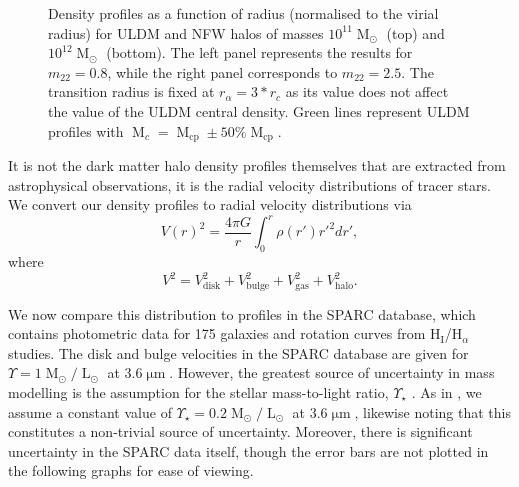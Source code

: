 \documentclass[a4paper,11pt]{article}
\begin{document}
\begin{figure}
\begin{tabular}{cc}
\end{tabular}
\caption{Density profiles as a function of radius (normalised to the virial radius) for ULDM and NFW halos of masses $10^{11}\operatorname{M}_{\odot}$ (top) and $10^{12}\operatorname{M}_{\odot}$ (bottom). The left panel represents the results for $m_{22} = 0.8$, while the right panel corresponds to $m_{22}=2.5$. The transition radius is fixed at $r_{\alpha} = 3*r_c$ as its value does not affect the value of the ULDM central density. Green lines represent  ULDM profiles with $\operatorname{M}_c = \operatorname{M}_{\mathrm{cp}} \pm 50 \% \operatorname{M}_{\mathrm{cp}}$.}\label{fig:profiles}
\end{figure}

It is not the dark matter halo density profiles themselves that are extracted from astrophysical observations, it is the radial velocity distributions of tracer stars. We convert our density profiles to radial velocity distributions \cite{Sofue:2008wt} via 
%
\begin{equation}
    V(r)^2 = \frac{4\pi G}{r}\int_0^r \rho(r')r'^2 dr',
\end{equation}
where 
\begin{equation}\label{eq:vel_decomp}
    V^2 = V_{\mathrm{disk}}^2 + V_{\mathrm{bulge}}^2 + V_{\mathrm{gas}}^2 + V_{\mathrm{halo}}^2.
\end{equation}
%


We now compare this distribution to profiles in the SPARC database, which contains photometric data for 175 galaxies and rotation curves from $\mathrm{H}_{\mathrm{I}}$/$\mathrm{H}_{\alpha}$ studies. The disk and bulge velocities in the SPARC database are given for $\Upsilon = 1 \operatorname{M}_{\odot}/\operatorname{L}_{\odot}$ at $3.6\operatorname{\mu m}$. However, the greatest source of uncertainty in mass modelling is the assumption for the stellar mass-to-light ratio, $\Upsilon_\star$ \cite{Lelli:2016zqa}. As in \cite{Robles:2018fur}, we  assume a constant value of $\Upsilon_\star = 0.2 \operatorname{M}_{\odot}/\operatorname{L}_{\odot}$ at $3.6\operatorname{\mu m}$, likewise noting that  this constitutes a non-trivial source of uncertainty. Moreover, there is significant uncertainty in the SPARC data itself, though the error bars are not plotted in the following graphs for ease of viewing. 
\end{document}
